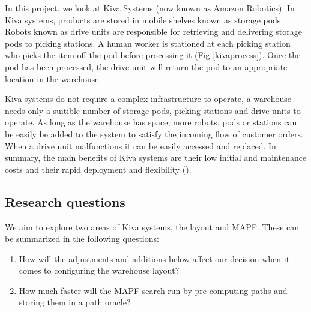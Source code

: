 \documentclass[a4paper,11pt]{article}
\begin{document}
In this project, we look at Kiva Systems (now known as Amazon Robotics). In Kiva systems, products are stored in mobile shelves known as storage pods. Robots known as drive units are responsible for retrieving and delivering storage pods to picking stations. A human worker is stationed at each picking station who picks the item off the pod before processing it (Fig \ref{kivaprocess}). Once the pod has been processed, the drive unit will return the pod to an appropriate location in the warehouse.



Kiva systems do not require a complex infrastructure to operate, a warehouse needs only a suitible number of storage pods, picking stations and drive units to operate. As long as the warehouse has space, more robots, pods or stations can be easily be added to the system to satisfy the incoming flow of customer orders. When a drive unit malfunctions it can be easily accessed and replaced. In summary, the main benefits of Kiva systems are their low initial and maintenance costs and their rapid deployment and flexibility (\cite{wurman2008coordinating}).



\newpage
\subsection{Research questions}
We aim to explore two areas of Kiva systems, the layout and MAPF. These can be summarized in the following questions:

\begin{enumerate}
	\item How will the adjustments and additions below affect our decision when it comes to configuring the warehouse layout?

\item How much faster will the MAPF search run by pre-computing paths and storing them in a path oracle?
\end{enumerate}
\end{document}
